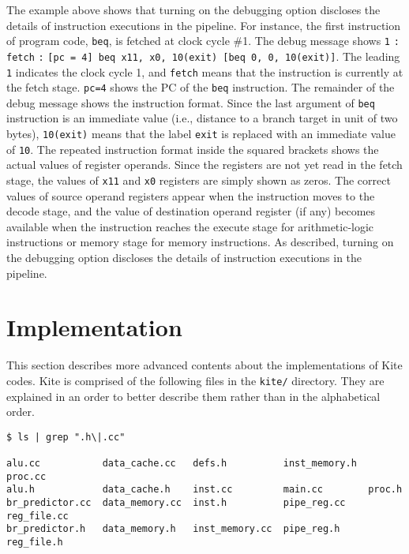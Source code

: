 \documentclass[10pt]{article}
\begin{document}
The example above shows that turning on the debugging option discloses the details of instruction executions in the pipeline.
For instance, the first instruction of program code, {\tt beq}, is fetched at clock cycle \#1.
The debug message shows {\tt 1} {\tt :} {\tt fetch} {\tt :} {\tt[pc = 4] beq x11, x0, 10(exit) [beq 0, 0, 10(exit)]}.
The leading {\tt 1} indicates the clock cycle 1, and {\tt fetch} means that the instruction is currently at the fetch stage.
{\tt pc=4} shows the PC of the {\tt beq} instruction.
The remainder of the debug message shows the instruction format.
Since the last argument of {\tt beq} instruction is an immediate value (i.e., distance to a branch target in unit of two bytes), {\tt 10(exit)} means that the label {\tt exit} is replaced with an immediate value of {\tt 10}.
The repeated instruction format inside the squared brackets shows the actual values of register operands.
Since the registers are not yet read in the fetch stage, the values of {\tt x11} and {\tt x0} registers are simply shown as zeros.
The correct values of source operand registers appear when the instruction moves to the decode stage, and the value of destination operand register (if any) becomes available when the instruction reaches the execute stage for arithmetic-logic instructions or memory stage for memory instructions.
As described, turning on the debugging option discloses the details of instruction executions in the pipeline.


\section{Implementation} \label{sec:implementation}
This section describes more advanced contents about the implementations of Kite codes.
Kite is comprised of the following files in the {\tt kite/} directory.
They are explained in an order to better describe them rather than in the alphabetical order.

\begin{Verbatim}[frame=single]
$ ls | grep ".h\|.cc"

alu.cc           data_cache.cc   defs.h          inst_memory.h  proc.cc
alu.h            data_cache.h    inst.cc         main.cc        proc.h
br_predictor.cc  data_memory.cc  inst.h          pipe_reg.cc    reg_file.cc
br_predictor.h   data_memory.h   inst_memory.cc  pipe_reg.h     reg_file.h
\end{Verbatim}
\end{document}
